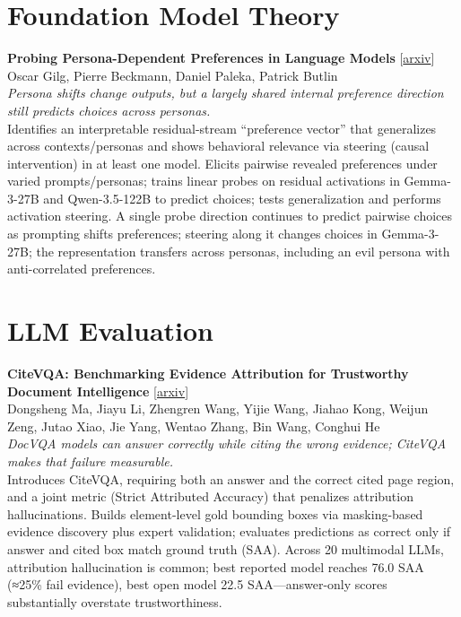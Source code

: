 \documentclass[12pt,letterpaper]{article}
\begin{document}
\medskip


\section*{Foundation Model Theory}

{\small\textbf{Probing Persona-Dependent Preferences in Language Models}} {\scriptsize[\href{https://arxiv.org/abs/2605.13339}{arxiv}]}\\
{\scriptsize Oscar Gilg, Pierre Beckmann, Daniel Paleka, Patrick Butlin}\\

{\small\textit{Persona shifts change outputs, but a largely shared internal preference direction still predicts choices across personas.}}\\[1pt]
{\footnotesize Identifies an interpretable residual-stream ``preference vector'' that generalizes across contexts/personas and shows behavioral relevance via steering (causal intervention) in at least one model. Elicits pairwise revealed preferences under varied prompts/personas; trains linear probes on residual activations in Gemma-3-27B and Qwen-3.5-122B to predict choices; tests generalization and performs activation steering. A single probe direction continues to predict pairwise choices as prompting shifts preferences; steering along it changes choices in Gemma-3-27B; the representation transfers across personas, including an evil persona with anti-correlated preferences.}

\medskip


\section*{LLM Evaluation}

{\small\textbf{CiteVQA: Benchmarking Evidence Attribution for Trustworthy Document Intelligence}} {\scriptsize[\href{https://arxiv.org/abs/2605.12882}{arxiv}]}\\
{\scriptsize Dongsheng Ma, Jiayu Li, Zhengren Wang, Yijie Wang, Jiahao Kong, Weijun Zeng, Jutao Xiao, Jie Yang, Wentao Zhang, Bin Wang, Conghui He}\\

{\small\textit{DocVQA models can answer correctly while citing the wrong evidence; CiteVQA makes that failure measurable.}}\\[1pt]
{\footnotesize Introduces CiteVQA, requiring both an answer and the correct cited page region, and a joint metric (Strict Attributed Accuracy) that penalizes attribution hallucinations. Builds element-level gold bounding boxes via masking-based evidence discovery plus expert validation; evaluates predictions as correct only if answer and cited box match ground truth (SAA). Across 20 multimodal LLMs, attribution hallucination is common; best reported model reaches 76.0 SAA (≈25\% fail evidence), best open model 22.5 SAA---answer-only scores substantially overstate trustworthiness.}
\end{document}
